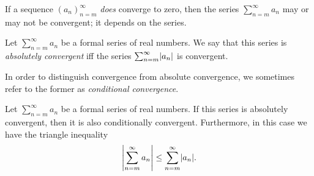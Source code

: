 \begin{note}
  If a sequence \((a_n)_{n = m}^\infty\) \emph{does} converge to zero, then the series \(\sum_{n = m}^\infty a_n\) may or may not be convergent;
  it depends on the series.
\end{note}

\setcounter{thm}{7}
\begin{defn}\label{i:7.2.8}
  Let \(\sum_{n = m}^\infty a_n\) be a formal series of real numbers.
  We say that this series is \emph{absolutely convergent} iff the series \(\sum_{n = m}^\infty \abs{a_n}\) is convergent.
\end{defn}

\begin{note}
  In order to distinguish convergence from absolute convergence, we sometimes refer to the former as \emph{conditional convergence}.
\end{note}

\begin{prop}\label{i:7.2.9}
  Let \(\sum_{n = m}^\infty a_n\) be a formal series of real numbers.
  If this series is absolutely convergent, then it is also conditionally convergent.
  Furthermore, in this case we have the triangle inequality
  \[
    \abs{\sum_{n = m}^\infty a_n} \leq \sum_{n = m}^\infty \abs{a_n}.
  \]
\end{prop}

